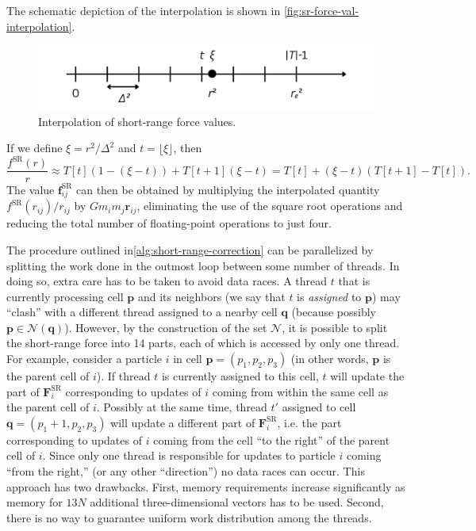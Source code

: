 The schematic depiction of the interpolation is shown in \autoref{fig:sr-force-val-interpolation}.
\begin{figure}[htp]
    \centering
    \includegraphics[scale=0.2]{img/interpolation.png}
    \caption{Interpolation of short-range force values.}
    \label{fig:sr-force-val-interpolation}
\end{figure}
If we define $\xi = r^2 / \Delta^2$ and $t=\lfloor \xi \rfloor$, then
\begin{equation*}
    \frac{f^\text{SR}(r)}{r} \approx T[t]\left(1 - (\xi - t)\right) + T[t+1](\xi - t)
    = T[t] + (\xi - t) (T[t+1] - T[t]).
\end{equation*}
The value $\mathbf{f}^\text{SR}_{ij}$ can then be obtained by multiplying the interpolated quantity $f^\text{SR}(r_{ij})/r_{ij}$ by $G m_i m_j \mathbf{r}_{ij}$, eliminating the use of the square root operations and reducing the total number of floating-point operations to just four.

The procedure outlined in\autoref{alg:short-range-correction} can be parallelized by splitting the work done in the outmost loop between some number of threads.
In doing so, extra care has to be taken to avoid data races.
A thread $t$ that is currently processing cell $\mathbf{p}$ and its neighbors (we say that $t$ is \textit{assigned} to $\mathbf{p}$) may ``clash'' with a different thread assigned to a nearby cell $\mathbf{q}$ (because possibly $\mathbf{p} \in \mathcal{N}(\mathbf{q})$).
However, by the construction of the set $\mathcal{N}$, it is possible to split the short-range force into 14 parts, each of which is accessed by only one thread.
For example, consider a particle $i$ in cell $\mathbf{p} = (p_1, p_2, p_3)$ (in other words, $\mathbf{p}$ is the parent cell of $i$).
If thread $t$ is currently assigned to this cell, $t$ will update the part of $\mathbf{F}^\text{SR}_i$ corresponding to updates of $i$ coming from within the same cell as the parent cell of $i$.
Possibly at the same time, thread $t'$ assigned to cell $\mathbf{q} = (p_1+1, p_2, p_3)$ will update a different part of $\mathbf{F}^\text{SR}_i$, i.e. the part corresponding to updates of $i$ coming from the cell ``to the right'' of the parent cell of $i$.
Since only one thread is responsible for updates to particle $i$ coming ``from the right,'' (or any other ``direction'') no data races can occur.
This approach has two drawbacks.
First, memory requirements increase significantly as memory for $13N$ additional three-dimensional vectors has to be used.
Second, there is no way to guarantee uniform work distribution among the threads.